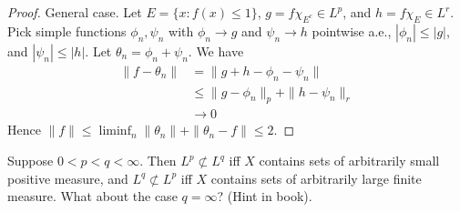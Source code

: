 \documentclass{article}
\begin{document}
\begin{proof}
General case. Let $E = \{x : f(x) \le 1\}$, $g = f \chi_{E^c} \in L^p$, and $h = f \chi_E \in L^r$. Pick simple functions $\phi_n, \psi_n$ with $\phi_n \to g$ and $\psi_n \to h$ pointwise a.e., $|\phi_n| \le |g|$, and $|\psi_n| \le |h|$.  Let $\theta_n = \phi_n + \psi_n$.  We have
\begin{align*}
\|f - \theta_n \| & = \|g + h - \phi_n - \psi_n\|
\\ & \le \|g - \phi_n\|_p + \|h - \psi_n\|_r
\\ & \to 0
\end{align*} 
Hence $\|f\| \le \liminf_n \|\theta_n\| + \|\theta_n - f\| \le 2$. 
\end{proof}


 Suppose $0 < p < q < \infty$. Then $L^p \not\subset L^q$ iff $X$ contains sets of arbitrarily small positive measure, and $L^q \not \subset L^p$ iff $X$ contains sets of arbitrarily large finite measure. What about the case $q = \infty$? (Hint in book).
\end{document}
